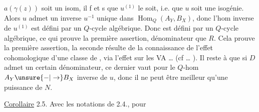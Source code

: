 $a(\gamma(z))$ soit un isom, il f et s que $u^{(1)}$ le soit, i.e. que $u$ soit une isogénie. Alors $u$ admet un inverse $u^{-1}$ unique dans $\operatorname{Hom}_Q(A_Y,B_X)$,  donc l'hom inverse de $u^{(1)}$ est défini par un $Q$-cycle algébrique.  Donc  est défini par un $Q$-cycle algébrique, ce qui prouve la première assertion,  dénominateur que $R$. Cela prouve la première assertion, la seconde résulte de la connaissance de l'effet cohomologique d'une classe de  , via l'effet sur les VA \ldots{} (cf \ldots{} ). Il reste à  que si $D$ admet un certain dénominateur, ce dernier vaut pour le  $Q$-hom $A_Y\unsure{\mathbin{-}|\to}B_X$ inverse de $u$, donc il  ne peut être meilleur qu'une puissance de  $N$.

\uline{Corollaire} 2.5. Avec les notations de 2.4., pour

